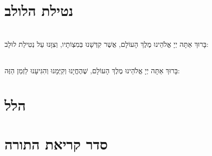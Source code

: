 \documentclass[twoside, openany, parskip=half, 11pt]{book}
\begin{document}
\tachanunim

\vfill

\\
\\

\clearpage

\section[נטילת הלולב]{ נטילת הלולב }

\\
בָּרוּךְ אַתָּה יְיָ אֱלֹהֵינוּ מֶלֶךְ הָעוֹלָם, אֲשֶׁר קִדְּשָׁנוּ בְּמִצְוֹתָיו, וְצִוָּנוּ עַל נְטִילַת לוּלָב:

\vspace{.5\baselineskip}

\\
בָּרוּךְ אַתָּה יְיָ אֱלֹהֵינוּ מֶלֶךְ הָעוֹלָם, שֶׁהֶחֱיָנוּ וְקִיְּמָנוּ וְהִגִּיעָנוּ לַזְמַן הַזֶּה:

\section[הלל‎]{ הלל‎ }
\label{sometimes hallel}

\hallel{\chazzan}

\vfill

\label{shabboskaddishtiskabel}
\fullkaddish

\bigskip 


\nextpage

\section[סדר קריאת התורה]{ סדר קריאת התורה }


\end{document}
